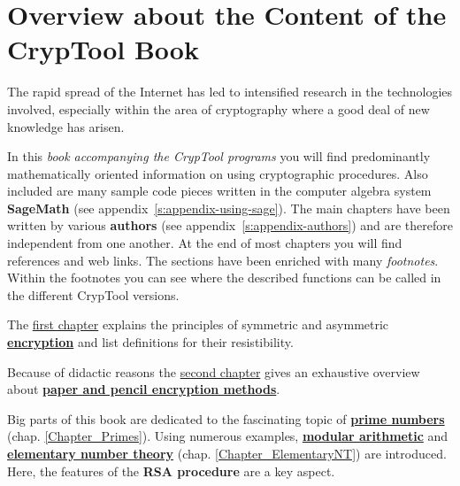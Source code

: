 %

\clearpage
\setcounter{secnumdepth}{-1}  %
\chapter{Overview about the Content of the CrypTool Book}
\setcounter{secnumdepth}{4}  %

\parskip 4pt
The rapid spread of the Internet has led to intensified research in the
technologies involved, especially within the area of cryptography where a good
deal of new knowledge has arisen.

In this {\em book accompanying the CrypTool programs} 
you will find predominantly mathematically oriented information on using
cryptographic procedures. Also included are many sample code pieces written in the
computer algebra system {\bf SageMath} (see appendix~\ref{s:appendix-using-sage}).
The main chapters have been written by various {\bf authors}
(see appendix~\ref{s:appendix-authors})
and are therefore independent from one another. At the end of most chapters
you will find references and web links.
The sections have been enriched with many {\em footnotes}. Within the footnotes
you can see where the described functions can be called in the different CrypTool
versions.

The \hyperlink{Chapter_EncryptionSecDefinitions}{first chapter} explains the
principles of symmetric and asymmetric \hyperlink{Chapter_EncryptionSecDefinitions}
{\bf encryption} and list definitions for their resistibility.

Because of didactic reasons the \hyperlink{Chapter_PaperandPencil}
{second chapter} gives an exhaustive overview about
\hyperlink{Chapter_PaperandPencil}{\bf paper and pencil encryption methods}.

Big parts of this book are dedicated to the fascinating topic of
\hyperlink{Chapter_Primes}{\bf prime numbers} (chap. \ref{Chapter_Primes}).
Using numerous examples, \hyperlink{Chapter_ElementaryNT}{\bf modular arithmetic}
and \hyperlink{Chapter_ElementaryNT}{\bf elementary number theory}
(chap. \ref{Chapter_ElementaryNT}) are introduced. Here, the features
of the {\bf RSA procedure} are a key aspect.

